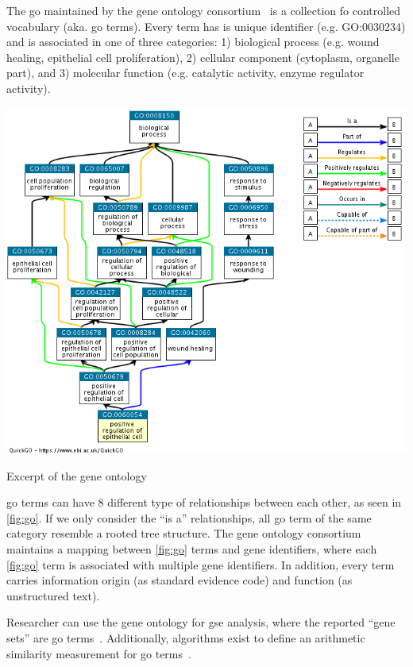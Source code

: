 \documentclass{thesisclass}
\begin{document}

The \acrfull{go} maintained by the gene ontology consortium~\cite{Ashburner2000,doi:10.1093/nar/gkw1108} is a collection fo controlled vocabulary (aka. \acrshort{go} terms). Every term has is unique identifier (e.g. GO:0030234) and is associated in one of three categories: 1) biological process (e.g. wound healing, epithelial cell proliferation), 2) cellular component (cytoplasm, organelle part), and 3) molecular function (e.g. catalytic activity, enzyme regulator activity). 

\begin{centeredFigure}[!ht]
	\includegraphics[scale=0.4]{figures/introduction/go.png}
	\caption{Excerpt of the gene ontology}
	\label{fig:go}
\end{centeredFigure}

\acrshort{go} terms can have 8 different type of relationships between each other, as seen in \cref{fig:go}. If we only consider the ``is a'' relationships, all \acrshort{go} term of the same category resemble a rooted tree structure. The gene ontology consortium maintains a mapping between \cref{fig:go} terms and gene identifiers, where each \cref{fig:go} term is associated with multiple gene identifiers. In addition, every term carries information origin (as standard evidence code) and function (as unstructured text).

Researcher can use the gene ontology for \acrshort{gse} analysis, where the reported ``gene sets'' are \acrshort{go} terms~\cite{doi:10.1093/bioinformatics/btl140}.  Additionally, algorithms exist to define an arithmetic similarity measurement for \acrshort{go} terms~\cite{doi:10.1093/bioinformatics/btq064}.
\end{document}
